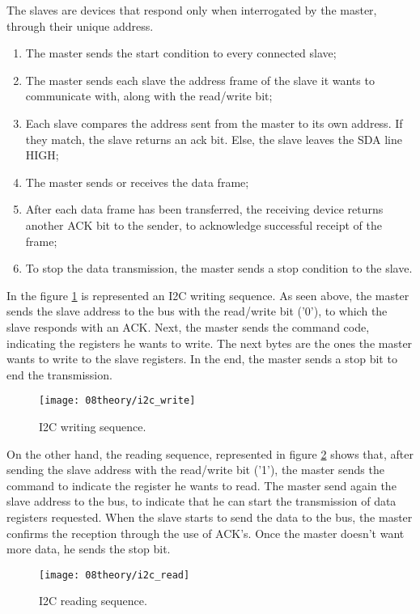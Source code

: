 
The slaves are devices that respond only when interrogated by the master, through their unique address.
\begin{enumerate}
	\item The master sends the start condition to every connected slave;
	\item The master sends each slave the address frame of the slave it wants to communicate with, along with the read/write bit;
	\item Each slave compares the address sent from the master to its own address. If they match, the slave returns an \ac{ack} bit. Else, the slave leaves the SDA line HIGH;
	\item The master sends or receives the data frame;
	\item After each data frame has been transferred, the receiving device returns another ACK bit to the sender, to acknowledge successful receipt of the frame;
	\item To stop the data transmission, the master sends a stop condition to the slave.
\end{enumerate}

In the figure \ref{fig:i2c_write} is represented an I2C writing sequence. As seen above, the master sends the slave address to the bus with the read/write bit ('0'), to which the slave responds with an ACK. Next, the master sends the command code, indicating the registers he wants to write. The next bytes are the ones the master wants to write to the slave registers. In the end, the master sends a stop bit to end the transmission.

\begin{figure}[H]
	\centering
	\texttt{[image: 08theory/i2c\_write]}
	\caption{I2C writing sequence.}
	\label{fig:i2c_write}
\end{figure}

On the other hand, the reading sequence, represented in figure \ref{fig:i2c_read} shows that, after sending the slave address with the read/write bit ('1'), the master sends the command to indicate the register he wants to read. The master send again the slave address to the bus, to indicate that he can start the transmission of data registers requested. When the slave starts to send the data to the bus, the master confirms the reception through the use of ACK's. Once the master doesn't want more data, he sends the stop bit.

\begin{figure}[H]
	\centering
	\texttt{[image: 08theory/i2c\_read]}
	\caption{I2C reading sequence.}
	\label{fig:i2c_read}
\end{figure}


